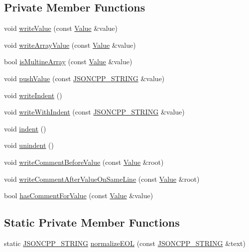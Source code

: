 \subsection*{Private Member Functions}
\begin{DoxyCompactItemize}
\item 
void \hyperlink{class_json_1_1_styled_writer_ac40143cf43f7c4a94d3d0b41e5245069}{write\+Value} (const \hyperlink{class_json_1_1_value}{Value} \&value)
\item 
void \hyperlink{class_json_1_1_styled_writer_a0618c23d62965515def15ece1e677f5d}{write\+Array\+Value} (const \hyperlink{class_json_1_1_value}{Value} \&value)
\item 
bool \hyperlink{class_json_1_1_styled_writer_aa5dc671edf10b9976f1511da2271ab9d}{is\+Multine\+Array} (const \hyperlink{class_json_1_1_value}{Value} \&value)
\item 
void \hyperlink{class_json_1_1_styled_writer_a236a833b4bdaa09915c2cac715970f08}{push\+Value} (const \hyperlink{json_8h_a1e723f95759de062585bc4a8fd3fa4be}{J\+S\+O\+N\+C\+P\+P\+\_\+\+S\+T\+R\+I\+NG} \&value)
\item 
void \hyperlink{class_json_1_1_styled_writer_a885f4bfb5701896d60eee6716d2db7e4}{write\+Indent} ()
\item 
void \hyperlink{class_json_1_1_styled_writer_ac38e02972054125c38efbe327b52f6ac}{write\+With\+Indent} (const \hyperlink{json_8h_a1e723f95759de062585bc4a8fd3fa4be}{J\+S\+O\+N\+C\+P\+P\+\_\+\+S\+T\+R\+I\+NG} \&value)
\item 
void \hyperlink{class_json_1_1_styled_writer_a0b65be6186a7c6638270990265e42b97}{indent} ()
\item 
void \hyperlink{class_json_1_1_styled_writer_acee1c9285519b573cfcb00b7e7f5a809}{unindent} ()
\item 
void \hyperlink{class_json_1_1_styled_writer_ad3452c48fabf968bf3693549331ec06e}{write\+Comment\+Before\+Value} (const \hyperlink{class_json_1_1_value}{Value} \&root)
\item 
void \hyperlink{class_json_1_1_styled_writer_ab12b274c62822fc51ec4617c6be95139}{write\+Comment\+After\+Value\+On\+Same\+Line} (const \hyperlink{class_json_1_1_value}{Value} \&root)
\item 
bool \hyperlink{class_json_1_1_styled_writer_a37a806d010f708cb68556f2666f79bdf}{has\+Comment\+For\+Value} (const \hyperlink{class_json_1_1_value}{Value} \&value)
\end{DoxyCompactItemize}
\subsection*{Static Private Member Functions}
\begin{DoxyCompactItemize}
\item 
static \hyperlink{json_8h_a1e723f95759de062585bc4a8fd3fa4be}{J\+S\+O\+N\+C\+P\+P\+\_\+\+S\+T\+R\+I\+NG} \hyperlink{class_json_1_1_styled_writer_a692dda1b1621fb5620e0a7b1b10f3b1f}{normalize\+E\+OL} (const \hyperlink{json_8h_a1e723f95759de062585bc4a8fd3fa4be}{J\+S\+O\+N\+C\+P\+P\+\_\+\+S\+T\+R\+I\+NG} \&text)
\end{DoxyCompactItemize}
